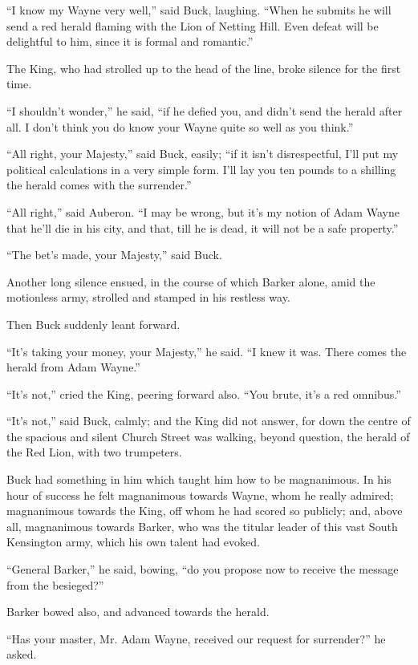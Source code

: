 \documentclass{book}
\begin{document}
“I know my Wayne very well,” said Buck, laughing. “When he submits he will send a red herald flaming with the Lion of Netting Hill. Even defeat will be delightful to him, since it is formal and romantic.”

The King, who had strolled up to the head of the line, broke silence for the first time.

“I shouldn’t wonder,” he said, “if he defied you, and didn’t send the herald after all. I don’t think you do know your Wayne quite so well as you think.”

“All right, your Majesty,” said Buck, easily; “if it isn’t disrespectful, I’ll put my political calculations in a very simple form. I’ll lay you ten pounds to a shilling the herald comes with the surrender.”

“All right,” said Auberon. “I may be wrong, but it’s my notion of Adam Wayne that he’ll die in his city, and that, till he is dead, it will not be a safe property.”

“The bet’s made, your Majesty,” said Buck.

Another long silence ensued, in the course of which Barker alone, amid the motionless army, strolled and stamped in his restless way.

Then Buck suddenly leant forward.

“It’s taking your money, your Majesty,” he said. “I knew it was. There comes the herald from Adam Wayne.”

“It’s not,” cried the King, peering forward also. “You brute, it’s a red omnibus.”

“It’s not,” said Buck, calmly; and the King did not answer, for down the centre of the spacious and silent Church Street was walking, beyond question, the herald of the Red Lion, with two trumpeters.

Buck had something in him which taught him how to be magnanimous. In his hour of success he felt magnanimous towards Wayne, whom he really admired; magnanimous towards the King, off whom he had scored so publicly; and, above all, magnanimous towards Barker, who was the titular leader of this vast South Kensington army, which his own talent had evoked.

“General Barker,” he said, bowing, “do you propose now to receive the message from the besieged?”

Barker bowed also, and advanced towards the herald.

“Has your master, Mr. Adam Wayne, received our request for surrender?” he asked.
\end{document}
